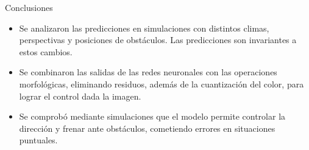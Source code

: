 \documentclass[10pt, usepdftitle=false]{beamer}
\begin{document}
\begin{frame}[fragile]{Conclusiones}
\begin{itemize}[<+-|alert@+>]
	\item Se analizaron las predicciones en simulaciones con distintos climas, perspectivas y posiciones de obstáculos. Las predicciones son invariantes a estos cambios.
	
	\item Se combinaron las salidas de las redes neuronales con las operaciones morfológicas, eliminando residuos, además de la cuantización del color, para lograr el control dada la imagen.
	
	\item Se comprobó mediante simulaciones que el modelo permite controlar la dirección y frenar ante obstáculos, cometiendo errores en situaciones puntuales.
\end{itemize}
\end{frame}
\end{document}
